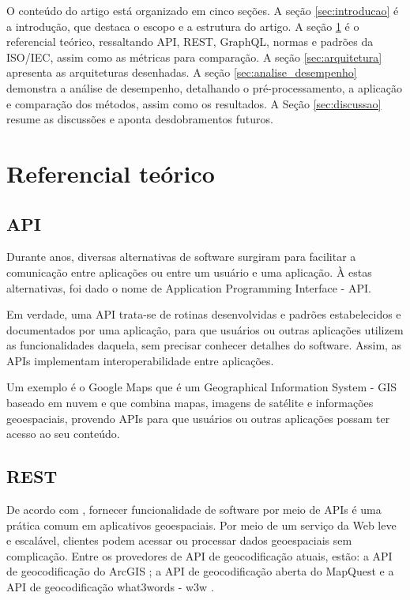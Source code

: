 \documentclass[conference]{IEEEtran}
\begin{document}
O conteúdo do artigo está organizado em cinco seções. A seção \ref{sec:introducao} é a introdução, que destaca o escopo e a estrutura do artigo. A seção \ref{sec:ref_teorico} é o referencial teórico, ressaltando API, REST, GraphQL, normas e padrões da ISO/IEC, assim como as métricas para comparação. A seção \ref{sec:arquitetura} apresenta as arquiteturas desenhadas. A seção \ref{sec:analise_desempenho} demonstra a análise de desempenho, detalhando o pré-processamento, a aplicação e comparação dos métodos, assim como os resultados. A Seção \ref{sec:discussao} resume as discussões e aponta desdobramentos futuros.

\section{Referencial teórico}
\label{sec:ref_teorico}

\subsection{API}
Durante anos, diversas alternativas de software surgiram para facilitar a comunicação entre aplicações ou entre um usuário e uma  aplicação. À estas alternativas, foi dado o nome de Application Programming Interface - API.

Em verdade, uma API trata-se de rotinas desenvolvidas e padrões estabelecidos e documentados por uma aplicação, para que usuários ou outras aplicações utilizem as funcionalidades daquela, sem precisar conhecer detalhes do software. Assim, as APIs implementam interoperabilidade entre aplicações.

Um exemplo é o Google Maps \cite{GoogleMaps:2019} que é um Geographical Information System - GIS baseado em nuvem e que combina mapas, imagens de satélite e informações geoespaciais, provendo APIs para que usuários ou outras aplicações possam ter acesso ao seu conteúdo.\cite{nourjou:2016}

\subsection{REST}

De acordo com \cite{jiang:2018}, fornecer funcionalidade de software por meio de APIs é uma prática comum em aplicativos geoespaciais. Por meio de um serviço da Web leve e escalável, clientes podem acessar ou processar dados geoespaciais sem complicação. Entre os provedores de API de geocodificação atuais, estão: a API de geocodificação do ArcGIS \cite{ArcGISAPIREST:2019}; a API de geocodificação aberta do MapQuest \cite{MapQuestAPIREST:2019} e a API de geocodificação what3words - w3w \cite{w3wAPI:2019}.
\end{document}
